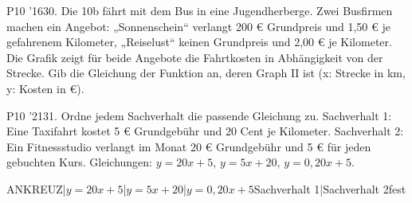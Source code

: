 \documentclass[11pt]{article}
\begin{document}
\pfgruppe{}
\begin{pfaufg}{P10 ’16}{\llap{\textasteriskcentered\,}30.}{}
Die 10b fährt mit dem Bus in eine Jugendherberge. Zwei Busfirmen machen ein Angebot: „Sonnenschein“ verlangt 200 € Grundpreis und 1,50 € je gefahrenem Kilometer, „Reiselust“ keinen Grundpreis und 2,00 € je Kilometer. Die Grafik zeigt für beide Angebote die Fahrtkosten in Abhängigkeit von der Strecke. Gib die Gleichung der Funktion an, deren Graph II ist (x: Strecke in km, y: Kosten in €).
\par\smallskip\noindent {}
\par\smallskip\noindent {}\par
{}
\end{pfaufg}
\begin{pfaufg}{P10 ’21}{31.}{}
Ordne jedem Sachverhalt die passende Gleichung zu. Sachverhalt 1: Eine Taxifahrt kostet 5 € Grundgebühr und 20 Cent je Kilometer. Sachverhalt 2: Ein Fitnessstudio verlangt im Monat 20 € Grundgebühr und 5 € für jeden gebuchten Kurs. Gleichungen: $y = 20x + 5$, $y = 5x + 20$, $y = 0{,}20x + 5$.
\par\smallskip\noindent ANKREUZ{|$y = 20x + 5$|$y = 5x + 20$|$y = 0{,}20x + 5$}{Sachverhalt 1|Sachverhalt 2}{fest}\par
{}
\end{pfaufg}
\end{document}
